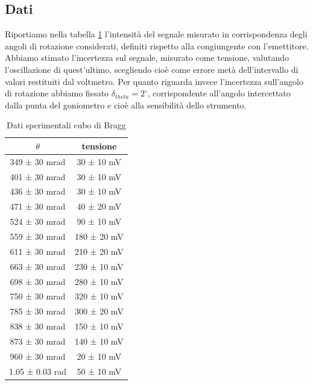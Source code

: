 \documentclass[a4paper]{article}
\begin{document}
\subsection{Dati}
Riportiamo nella tabella \ref{tab:bragg} l'intensità del segnale misurato in corrispondenza degli angoli di rotazione considerati, definiti rispetto 
alla congiungente con l'emettitore.
Abbiamo stimato l'incertezza sul segnale, misurato come tensione, valutando l'oscillazione di quest'ultimo, scegliendo cioè come errore metà dell'intervallo di valori restituiti dal voltmetro. Per quanto riguarda invece l'incertezza sull'angolo di rotazione abbiamo fissato $\delta_{theta}=2^\circ$, corrispondente all'angolo intercettato dalla punta del goniometro e cioè alla sensibilità dello strumento.

\begin{table}[htbp]
\centering
\begin{tabular}{|c|c|}
\hline
$\theta$ & tensione \\\hline\hline
349 ± 30 mrad & 30 ± 10 mV \\
401 ± 30 mrad & 30 ± 10 mV \\
436 ± 30 mrad & 30 ± 10 mV \\
471 ± 30 mrad & 40 ± 20 mV \\
524 ± 30 mrad & 90 ± 10 mV \\
559 ± 30 mrad & 180 ± 20 mV \\
611 ± 30 mrad & 210 ± 20 mV \\
663 ± 30 mrad & 230 ± 10 mV \\
698 ± 30 mrad & 280 ± 10 mV \\
750 ± 30 mrad & 320 ± 10 mV \\
785 ± 30 mrad & 300 ± 20 mV \\
838 ± 30 mrad & 150 ± 10 mV \\
873 ± 30 mrad & 140 ± 10 mV \\
960 ± 30 mrad & 20 ± 10 mV \\
1.05 ± 0.03 rad & 50 ± 10 mV \\
\hline
\end{tabular}
\caption{Dati sperimentali cubo di Bragg}
\label{tab:bragg}
\end{table}
\end{document}
